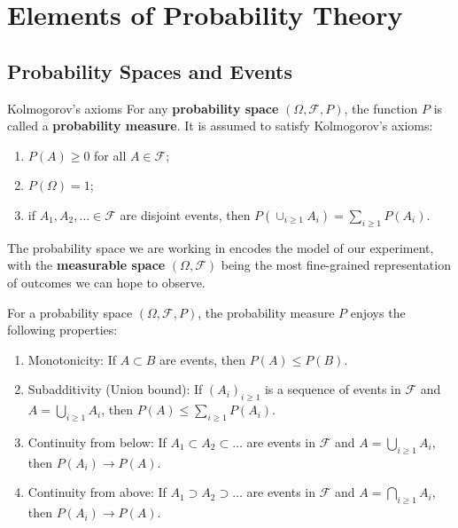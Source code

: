 \section{Elements of Probability Theory}

\subsection{Probability Spaces and Events}

\begin{defn}{Kolmogorov's axioms}{}
    For any \textbf{probability space} \( (\Omega, \mathcal{F}, P ) \), the function \( P \) is called a \textbf{probability measure}. It is assumed to satisfy Kolmogorov's axioms:
    
    \begin{enumerate}[label = \emph{\roman*.)}]
        \item \( P(A) \geq 0 \) for all \( A \in \mathcal{F}  \);
        \item \( P(\Omega )  = 1\);
        \item if \( A_1, A_2, \dots \in \mathcal{F}  \)  are disjoint events, then \( P(\cup _{i\geq 1}A_{i} ) = \sum_{i\geq 1}P(A_{i} )  \). 
    \end{enumerate}
    \end{defn}

    The probability space we are working in encodes the model of our experiment, with the \textbf{measurable space} \( (\Omega , \mathcal{F} ) \) being the most fine-grained representation of outcomes we can hope to observe.

    \begin{thrm}{}{}
        For a probability space \( (\Omega , \mathcal{F} ,P) \), the probability measure \( P \) enjoys the following properties:
        \begin{enumerate}[label=\emph{\roman*.)}]
            \item Monotonicity: If \( A \subset B \) are events, then \( P(A) \leq P(B) \). 
            \item Subadditivity (Union bound): If \( (A_{i} )_{i\geq 1} \) is a sequence of events in \( \mathcal{F}  \) and \( A = \bigcup_{i\geq 1}A_{i}   \), then \( P(A) \leq \sum_{i\geq 1}P(A_{i} )  \). 
            \item Continuity from below: If \( A_1 \subset A_2 \subset  \dots  \) are events in \( \mathcal{F}  \) and \( A = \bigcup_{i\geq 1} A_{i} \), then \( P(A_{i} )  \to  P(A) \). 
            \item Continuity from above: If \( A_1 \supset A_2 \supset \dots  \) are events in \( \mathcal{F}  \) and \( A = \bigcap_{i\geq 1} A_{i}  \), then \( P(A_{i} ) \to  P(A) \). 
        \end{enumerate} 
    \end{thrm}

